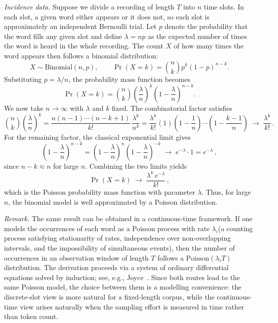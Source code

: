 \documentclass{article}
\begin{document}
{\medskip
 
\emph{Incidence data.}\;
Suppose we divide a recording of length $T$ into $n$ time slots. In each slot, a given word either appears or it does not, so each slot is approximately an independent Bernoulli trial. Let $p$ denote the probability that the word fills any given slot and define $\lambda = np$ as the expected number of times the word is heard in the whole recording. The count $X$ of how many times the word appears then follows a binomial distribution:
\[
X \sim \mathrm{Binomial}(n,p), \qquad
\Pr(X=k) = \binom{n}{k}p^k(1-p)^{n-k}.
\]
Substituting $p = \lambda/n$, the probability mass function becomes
\[
\Pr(X=k) = \binom{n}{k}\left(\frac{\lambda}{n}\right)^k\left(1-\frac{\lambda}{n}\right)^{n-k}.
\]
We now take $n \to \infty$ with $\lambda$ and $k$ fixed. The combinatorial factor satisfies
\[
\binom{n}{k}\left(\frac{\lambda}{n}\right)^k
=
\frac{n(n-1)\cdots(n-k+1)}{k!}\,\frac{\lambda^k}{n^k}
=
\frac{\lambda^k}{k!}\left(1\right)\left(1-\frac{1}{n}\right)\cdots\left(1-\frac{k-1}{n}\right)
\;\longrightarrow\; \frac{\lambda^k}{k!}\,.
\]
For the remaining factor, the classical exponential limit gives
\[
\left(1-\frac{\lambda}{n}\right)^{n-k}
=
\left(1-\frac{\lambda}{n}\right)^{n}
\left(1-\frac{\lambda}{n}\right)^{-k}
\;\longrightarrow\; e^{-\lambda}\cdot 1
=
e^{-\lambda}\,,
\]
since $n - k \approx n$ for large $n$. Combining the two limits yields
\[
\Pr(X=k)
\;\longrightarrow\;
\frac{\lambda^k\, e^{-\lambda}}{k!}\,,
\]
which is the Poisson probability mass function with parameter $\lambda$. Thus, for large $n$, the binomial model is well approximated by a Poisson distribution.
 
\medskip

\noindent
\emph{Remark.}\;
The same result can be obtained in a continuous-time framework. If one models
the occurrences of each word as a Poisson process with rate $\lambda_i$(a counting process satisfying stationarity of rates, independence over
non-overlapping intervals, and the impossibility of simultaneous
events), then the number of occurrences in an observation window of length $T$
follows a $\mathrm{Poisson}(\lambda_i T)$ distribution. The derivation proceeds
via a system of ordinary differential equations solved by induction; see,
e.g., Joyce~\cite{joyce2014poisson}. Since both routes lead to the same
Poisson model, the choice between them is a modelling convenience: the
discrete-slot view is more natural for a fixed-length corpus, while the
continuous-time view arises naturally when the sampling effort is measured in
time rather than token count.



}
\end{document}
